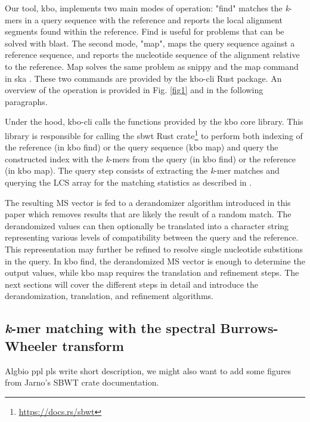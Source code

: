 \documentclass[unnumsec,webpdf,contemporary,large]{oup-authoring-template}%
\theoremstyle{thmstyleone}%
\theoremstyle{thmstyletwo}%
\theoremstyle{thmstylethree}%
\begin{document}
Our tool, kbo, implements two main modes of operation: "find" matches the \emph{k}-mers in a query sequence with the reference and reports the local alignment segments found within the reference. Find is useful for problems that can be solved with blast. The second mode, "map", maps the query sequence against a reference sequence, and reports the nucleotide sequence of the alignment relative to the reference. Map solves the same problem as snippy\cite{seemann2015snippy} and the map command in ska \cite{derelle2024seamless}. These two commands are provided by the kbo-cli Rust package. An overview of the operation is provided in Fig. \ref{fig1} and in the following paragraphs.
\begin{figure*}[!t]%
\centering
{}
\caption{\textbf{Draft} Overview of the kbo algorithms.}\label{fig1}
\end{figure*}

Under the hood, kbo-cli calls the functions provided by the kbo core library. This library is responsible for calling the sbwt Rust crate\footnote{\url{https://docs.rs/sbwt}} to perform both indexing of the reference (in kbo find) or the query sequence (kbo map) and query the constructed index with the \emph{k}-mers from the query (in kbo find) or the reference (in kbo map). The query step consists of extracting the \emph{k}-mer matches and querying the LCS array for the matching statistics as described in \cite{alanko2024finimizers}.

The resulting MS vector is fed to a derandomizer algorithm introduced in this paper which removes results that are likely the result of a random match. The derandomized values can then optionally be translated into a character string representing various levels of compatibility between the query and the reference. This representation may further be refined to resolve single nucleotide substitions in the query. In kbo find, the derandomized MS vector is enough to determine the output values, while kbo map requires the translation and refinement steps. The next sections will cover the different steps in detail and introduce the derandomization, translation, and refinement algorithms.

\subsection{\textit{k}-mer matching with the spectral Burrows-Wheeler transform}\label{kmermatching}
Algbio ppl pls write short description, we might also want to add some figures from Jarno's SBWT crate documentation.
\end{document}
